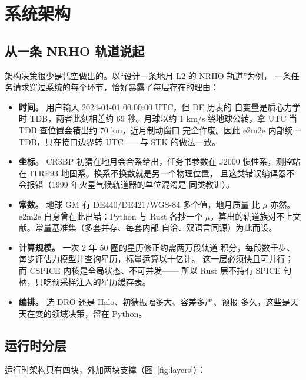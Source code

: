 \section{系统架构}
\label{sec:architecture}

\subsection{从一条 NRHO 轨道说起}

架构决策很少是凭空做出的。以“设计一条地月 L2 的 NRHO 轨道”为例，
一条任务请求穿过系统的每个环节，恰好暴露了每层存在的理由：

\begin{itemize}
  \item \textbf{时间。} 用户输入 2024-01-01 00:00:00 UTC，但 DE 历表的
        自变量是质心力学时 TDB，两者此刻相差约 69 秒。月球以约 1 km/s
        绕地球公转，拿 UTC 当 TDB 查位置会错出约 70 km，近月制动窗口
        完全作废。因此 e2m2e 内部统一 TDB，只在接口边界转 UTC——与
        STK 的做法一致。
  \item \textbf{坐标。} CR3BP 初猜在地月会合系给出，任务书参数在 J2000
        惯性系，测控站在 ITRF93 地固系。换系不换数就是另一个物理位置，
        且这类错误编译器不会报错（1999 年火星气候轨道器的单位混淆是
        同类教训）。
  \item \textbf{常数。} 地球 GM 有 DE440/DE421/WGS-84 多个值，地月质量
        比 $\mu$ 亦然。e2m2e 自身曾在此出错：Python 与 Rust 各抄一个
        $\mu$，算出的轨道族对不上文献。常量基准集（多套并存、每套内部
        自洽、双语言同源）为此而设。
  \item \textbf{计算规模。} 一次 2 年 50 圈的星历修正约需两万段轨道
        积分，每段数千步、每步评估力模型并查询星历，标量运算以十亿计。
        这一层必须快且可并行；而 CSPICE 内核是全局状态、不可并发——
        所以 Rust 层不持有 SPICE 句柄，只吃预采样注入的星历缓存表。
  \item \textbf{编排。} 选 DRO 还是 Halo、初猜振幅多大、容差多严、预报
        多久，这些是天天在变的领域决策，留在 Python。
\end{itemize}

\subsection{运行时分层}

运行时架构只有四块，外加两块支撑（图~\ref{fig:layers}）：

